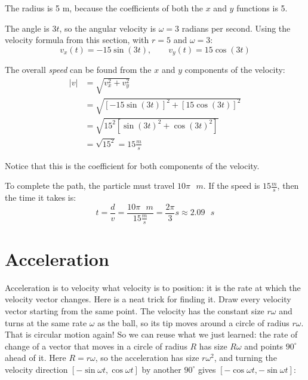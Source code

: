 \begin{Answer}[ref = particle]
  The radius is 5 m, because the coefficients of both the $x$ and $y$ functions is 5.

  The angle is $3t$, so the angular velocity is $\omega = 3$ radians per second. Using the velocity formula
  from this section, with $r = 5$ and $\omega = 3$:
  $$v_x(t) = -15 \sin{ \left( 3t \right)}, \qquad v_y(t) = 15 \cos{ \left( 3t \right)}$$

  The overall \textit{speed} can be found from the $x$ and $y$ components of the velocity:
  \begin{align*}
    |v| & = \sqrt{v_x^2 + v_y^2}                                                              \\ &= \sqrt{\left[ -15 \sin{ \left( 3t \right) } \right]^2 + \left[ 15 \cos{ \left( 3t \right)} \right]^2} \\
        & = \sqrt{15^2 \left[ \sin{ \left(3t \right)}^2 + \cos{ \left( 3t \right)}^2 \right]} \\ &= \sqrt{15^2} = 15 \frac{m}{s}
  \end{align*}

  Notice that this is the coefficient for both components of the velocity.

  To complete the path, the particle must travel $10\pi \text{ } m$. If the speed is $15 \frac{m}{s}$, then the time it takes is:
  $$t = \frac{d}{v} = \frac{10\pi \text{ } m}{15 \frac{m}{s}} = \frac{2\pi}{3} s \approx 2.09 \text{ } s$$
\end{Answer}

\section{Acceleration}

Acceleration is to velocity what velocity is to position: it is the rate at which the velocity vector
changes. Here is a neat trick for finding it. Draw every velocity vector starting from the same point. The
velocity has the constant size $r\omega$ and turns at the same rate $\omega$ as the ball, so its tip moves
around a circle of radius $r\omega$. That is circular motion again! So we can reuse what we just learned: the
rate of change of a vector that moves in a circle of radius $R$ has size $R\omega$ and points $90^\circ$ ahead
of it. Here $R = r\omega$, so the acceleration has size $r\omega^2$, and turning the velocity direction
$[-\sin \omega t, \cos \omega t]$ by another $90^\circ$ gives $[-\cos \omega t, -\sin \omega t]$:

